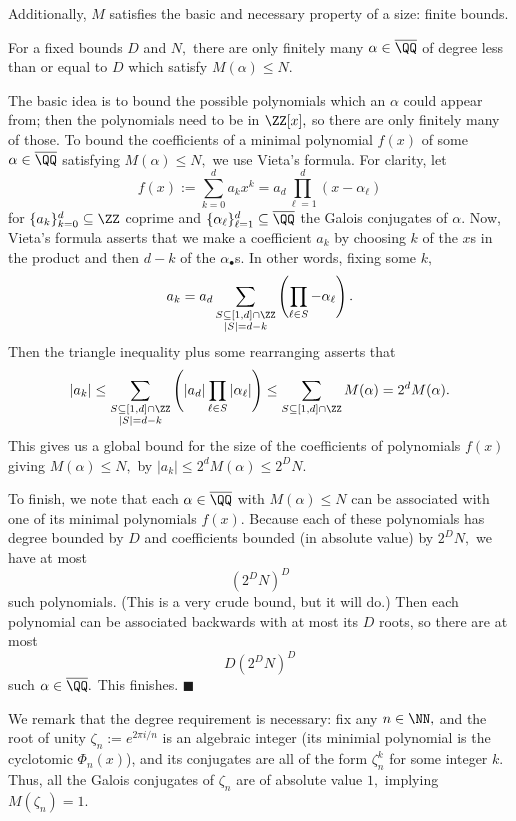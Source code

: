 Additionally, $M$ satisfies the basic and necessary property of a size: finite bounds.
\begin{proposition}
    For a fixed bounds $D$ and $N,$ there are only finitely many $\alpha\in\overline\QQ$ of degree less than or equal to $D$ which satisfy $M(\alpha)\le N.$
\end{proposition}
The basic idea is to bound the possible polynomials which an $\alpha$ could appear from; then the polynomials need to be in $\ZZ[x],$ so there are only finitely many of those. To bound the coefficients of a minimal polynomial $f(x)$ of some $\alpha\in\overline\QQ$ satisfying $M(\alpha)\le N,$ we use Vieta's formula. For clarity, let
\[f(x):=\sum_{k=0}^da_kx^k=a_d\prod_{\ell=1}^d(x-\alpha_\ell)\]
for $\{a_k\}_{k=0}^d\subseteq\ZZ$ coprime and $\{\alpha_\ell\}_{\ell=1}^d\subseteq\overline\QQ$ the Galois conjugates of $\alpha.$ Now, Vieta's formula asserts that we make a coefficient $a_k$ by choosing $k$ of the $x$s in the product and then $d-k$ of the $\alpha_\bullet$s. In other words, fixing some $k,$
\[a_k=a_d\sum_{\substack{S\subseteq[1,d]\cap\ZZ\\|S|=d-k}}\left(\prod_{\ell\in S}-\alpha_\ell\right).\]
Then the triangle inequality plus some rearranging asserts that
\[|a_k|\le\sum_{\substack{S\subseteq[1,d]\cap\ZZ\\|S|=d-k}}\left(|a_d|\prod_{\ell\in S}|\alpha_\ell|\right)\le\sum_{S\subseteq[1,d]\cap\ZZ}M(\alpha)=2^dM(\alpha).\]
This gives us a global bound for the size of the coefficients of polynomials $f(x)$ giving $M(\alpha)\le N,$ by $|a_k|\le 2^dM(\alpha)\le 2^DN.$

To finish, we note that each $\alpha\in\overline\QQ$ with $M(\alpha)\le N$ can be associated with one of its minimal polynomials $f(x).$ Because each of these polynomials has degree bounded by $D$ and coefficients bounded (in absolute value) by $2^DN,$ we have at most
\[\left(2^DN\right)^D\]
such polynomials. (This is a very crude bound, but it will do.) Then each polynomial can be associated backwards with at most its $D$ roots, so there are at most
\[D\left(2^DN\right)^D\]
such $\alpha\in\overline\QQ.$ This finishes. $\blacksquare$

We remark that the degree requirement is necessary: fix any $n\in\NN,$ and the root of unity $\zeta_n:=e^{2\pi i/n}$ is an algebraic integer (its minimial polynomial is the cyclotomic $\Phi_n(x)$), and its conjugates are all of the form $\zeta_n^k$ for some integer $k.$ Thus, all the Galois conjugates of $\zeta_n$ are of absolute value $1,$ implying $M(\zeta_n)=1.$

